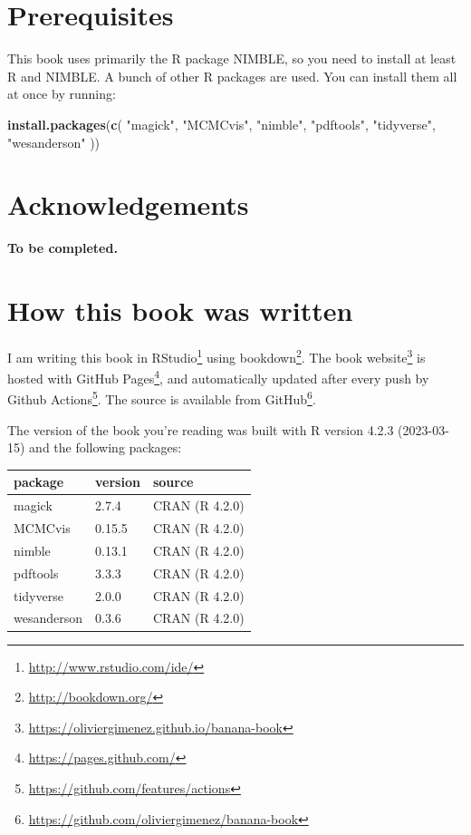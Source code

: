 \documentclass[
  12pt,
]{krantz}
\newenvironment{Shaded}{\begin{snugshade}}{\end{snugshade}}
\newcommand{\FunctionTok}[1]{\textcolor[rgb]{0.13,0.29,0.53}{\textbf{#1}}}
\newcommand{\NormalTok}[1]{#1}
\newcommand{\StringTok}[1]{\textcolor[rgb]{0.31,0.60,0.02}{#1}}
\renewcommand{\href}[2]{#2\footnote{\url{#1}}}
\begin{document}
\hypertarget{prerequisites}{%
\section*{Prerequisites}\label{prerequisites}}


This book uses primarily the R package NIMBLE, so you need to install at least R and NIMBLE. A bunch of other R packages are used. You can install them all at once by running:

\begin{Shaded}
\begin{Highlighting}[]
\FunctionTok{install.packages}\NormalTok{(}\FunctionTok{c}\NormalTok{(}
  \StringTok{"magick"}\NormalTok{, }\StringTok{"MCMCvis"}\NormalTok{, }\StringTok{"nimble"}\NormalTok{, }\StringTok{"pdftools"}\NormalTok{, }
  \StringTok{"tidyverse"}\NormalTok{, }\StringTok{"wesanderson"} 
\NormalTok{))}
\end{Highlighting}
\end{Shaded}

\hypertarget{acknowledgements}{%
\section*{Acknowledgements}\label{acknowledgements}}


\textbf{To be completed.}

\hypertarget{how-this-book-was-written}{%
\section*{How this book was written}\label{how-this-book-was-written}}


I am writing this book in \href{http://www.rstudio.com/ide/}{RStudio} using \href{http://bookdown.org/}{bookdown}. The \href{https://oliviergimenez.github.io/banana-book}{book website} is hosted with \href{https://pages.github.com/}{GitHub Pages}, and automatically updated after every push by \href{https://github.com/features/actions}{Github Actions}. The source is available from \href{https://github.com/oliviergimenez/banana-book}{GitHub}.

The version of the book you're reading was built with R version 4.2.3 (2023-03-15) and the following packages:

\begin{longtable}[]{@{}lll@{}}
\toprule\noalign{}
package & version & source \\
\midrule\noalign{}
\endhead
\bottomrule\noalign{}
\endlastfoot
magick & 2.7.4 & CRAN (R 4.2.0) \\
MCMCvis & 0.15.5 & CRAN (R 4.2.0) \\
nimble & 0.13.1 & CRAN (R 4.2.0) \\
pdftools & 3.3.3 & CRAN (R 4.2.0) \\
tidyverse & 2.0.0 & CRAN (R 4.2.0) \\
wesanderson & 0.3.6 & CRAN (R 4.2.0) \\
\end{longtable}
\end{document}
